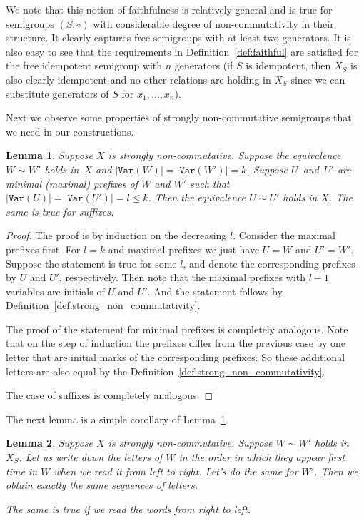 \documentclass[11pt,letterpaper]{article}
\newtheorem{lemma}{Lemma}
\newcommand{\var}{\texttt{Var}}
\begin{document}
We note that this notion of faithfulness is relatively general and is true for
semigroups $(S,\circ)$ with considerable degree of non-commutativity in their
structure. It clearly captures free semigroups with at least two generators. It is also easy to see that the
requirements in Definition~\ref{def:faithful} are satisfied for the free
idempotent semigroup with $n$ generators (if $S$ is idempotent, then $X_S$ is also
clearly idempotent and no other relations are holding in $X_S$ since we can
substitute generators of $S$ for $x_1, \ldots, x_n$).

Next we observe some properties of strongly non-commutative semigroups that we
need in our constructions.

\begin{lemma} \label{lem:prefix_equivalence}
Suppose $X$ is strongly non-commutative. Suppose the equivalence $W \sim W'$
holds in~$X$ and $|\var(W)|=|\var(W')|=k$. Suppose $U$~and~$U'$ are minimal
(maximal) prefixes of $W$ and $W'$ such that $|\var(U)| = |\var(U')| = l\leq k$.
Then the equivalence $U \sim U'$ holds in $X$. The same is true for suffixes.
\end{lemma}

\begin{proof}
The proof is by induction on the decreasing $l$. Consider the maximal prefixes
first. For $l=k$ and maximal prefixes we just have $U=W$ and $U'=W'$. Suppose
the statement is true for some $l$, and denote the corresponding prefixes by $U$
and $U'$, respectively. Then note that the maximal prefixes with $l-1$ variables
are initials of $U$ and $U'$. And the statement follows by
Definition~\ref{def:strong_non_commutativity}.

The proof of the statement for minimal prefixes is completely analogous. Note
that on the step of induction the prefixes differ from the previous case by one
letter that are initial marks of the corresponding prefixes. So these additional
letters are also equal by the Definition~\ref{def:strong_non_commutativity}.

The case of suffixes is completely analogous.
\end{proof}

The next lemma is a simple corollary of Lemma~\ref{lem:prefix_equivalence}.
\begin{lemma} \label{lem:variables_order}
Suppose $X$ is strongly non-commutative. Suppose $W \sim W'$ holds in $X_S$. Let us write down the letters of $W$ in the order in which they appear first time in $W$ when we read it from left to right. Let's do the same for $W'$. Then we obtain exactly the same sequences of letters.

The same is true if we read the words from right to left.
\end{lemma}
\end{document}
